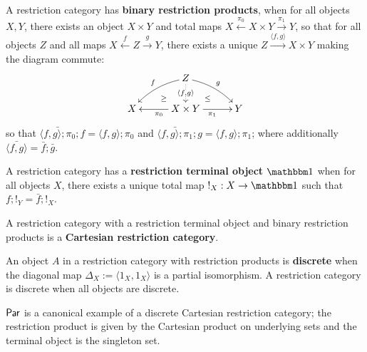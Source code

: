 \begin{definition}
A restriction category has {\bf binary restriction products}, when for all objects  $X,Y$, there exists an object $X\times Y$ and total maps $X \xleftarrow{\pi_0}  X\times Y \xrightarrow{\pi_1} Y$, so that for all objects $Z$ and all maps $X \xleftarrow{f} Z \xrightarrow{g} Y$, there exists a unique $Z\xrightarrow{\langle f,g \rangle} X\times Y$ making the diagram commute:
$$
\xymatrixrowsep{0.2cm}
\xymatrixcolsep{0.4cm}
\xymatrix{
&& Z\ar@{..>}[dd]|-{\langle f, g\rangle} \ar@/_/[ddll]_f \ar@/^/[ddrr]^g &&\\
& \ar@{}[dr]|-{\geq} && \ar@{}[dl] |-{\leq} &\\
X &&  X\times Y \ar[rr]_{\pi_1} \ar[ll]^{\pi_0}  && Y
}
$$
so that $\bar{\langle f, g\rangle ;\pi_0}; f = \langle f, g\rangle ;\pi_0$ and $\bar{\langle f, g\rangle; \pi_1} ;g = \langle f, g\rangle; \pi_1$;
where additionally $\bar{\langle f, g\rangle} =  \bar f ; \bar g$.


A restriction category has a {\bf restriction terminal object} $\one$ when for all objects $X$, there exists a unique total map $!_X:X\to\one$ such that $f ; !_Y = \bar  f; !_X$.

A restriction category with a restriction terminal object and binary restriction products is a {\bf Cartesian restriction category}.


An object $A$ in a restriction category with restriction products is {\bf discrete} when the diagonal map $\Delta_X:=\langle 1_X, 1_X\rangle$ is a partial isomorphism. A restriction category is discrete when all objects are discrete. 
\end{definition}
\begin{example}
$\mathsf{Par}$ is a canonical example of a discrete Cartesian restriction category; the restriction product is given by the Cartesian product on underlying sets and the terminal object is  the singleton set.
\end{example}
